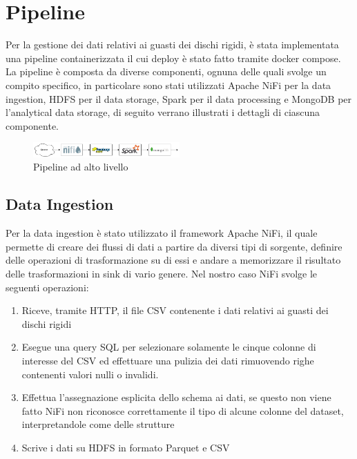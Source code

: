 \documentclass[conference]{IEEEtran}
\begin{document}
\section{Pipeline}
Per la gestione dei dati relativi ai guasti dei dischi rigidi, è stata implementata una pipeline containerizzata il cui deploy è stato fatto tramite docker compose. La pipeline è composta da diverse componenti, ognuna delle quali svolge un compito specifico, in particolare sono stati utilizzati Apache NiFi per la data ingestion, HDFS per il data storage, Spark per il data processing e MongoDB per l'analytical data storage, di seguito verrano illustrati i dettagli di ciascuna componente.
\begin{figure}[H]
    \centering
    \includegraphics[width=0.5\textwidth]{./res/pipeline_2.png}
    \caption{Pipeline ad alto livello}
    \label{fig:pipeline}
\end{figure} 
\subsection{Data Ingestion}
Per la data ingestion è stato utilizzato il framework Apache NiFi, il quale permette di creare dei flussi di dati a partire da diversi tipi di sorgente, definire delle operazioni di trasformazione su di essi e andare a memorizzare il risultato delle trasformazioni in sink di vario genere. Nel nostro caso NiFi svolge le seguenti operazioni:
\begin{enumerate}
    \item Riceve, tramite HTTP, il file CSV contenente i dati relativi ai guasti dei dischi rigidi
    \item Esegue una query SQL %
    per selezionare solamente le cinque colonne di interesse del CSV ed effettuare una pulizia dei dati rimuovendo righe contenenti valori nulli o invalidi. 
    \item Effettua l'assegnazione esplicita dello schema ai dati, se questo non viene fatto NiFi non riconosce correttamente il tipo di alcune colonne del dataset, interpretandole come delle strutture
    \item Scrive i dati su HDFS in formato Parquet e CSV
\end{enumerate}
\end{document}
